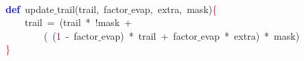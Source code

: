 \noindent
\mbox{} \\
\mbox{}\textbf{\textcolor{Blue}{def}}\ update$\_$trail\textcolor{BrickRed}{(}trail\textcolor{BrickRed}{,}\ factor$\_$evap\textcolor{BrickRed}{,}\ extra\textcolor{BrickRed}{,}\ mask\textcolor{BrickRed}{)}\textcolor{Red}{\{} \\
\mbox{}\ \ \ \ trail\ \textcolor{BrickRed}{=}\ \textcolor{BrickRed}{(}trail\ \textcolor{BrickRed}{*}\ \textcolor{BrickRed}{!}mask\ \textcolor{BrickRed}{+} \\
\mbox{}\ \ \ \ \ \ \ \ \textcolor{BrickRed}{(}\ \textcolor{BrickRed}{(}\textcolor{Purple}{1}\ \textcolor{BrickRed}{-}\ factor$\_$evap\textcolor{BrickRed}{)}\ \textcolor{BrickRed}{*}\ trail\ \textcolor{BrickRed}{+}\ factor$\_$evap\ \textcolor{BrickRed}{*}\ extra\textcolor{BrickRed}{)}\ \textcolor{BrickRed}{*}\ mask\textcolor{BrickRed}{)} \\
\mbox{}\textcolor{Red}{\}} \\
\mbox{}
